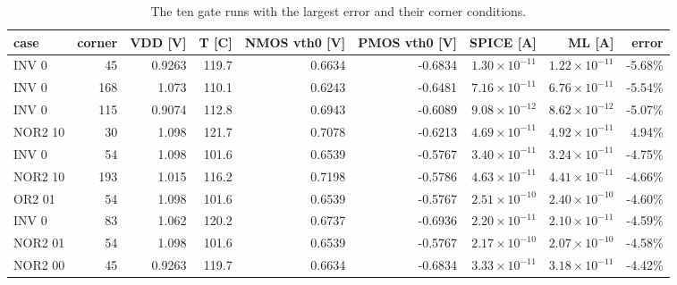 \begin{table}[H]
\centering
{\small
\begin{adjustbox}{max width=\linewidth}
\begin{tabular}{lrrrrrrrr}
\toprule
case & corner & VDD [V] & T [C] & NMOS vth0 [V] & PMOS vth0 [V] & SPICE [A] & ML [A] & error \\
\midrule
INV 0 & 45 & 0.9263 & 119.7 & 0.6634 & -0.6834 & $1.30\times10^{-11}$ & $1.22\times10^{-11}$ & -5.68\% \\
INV 0 & 168 & 1.073 & 110.1 & 0.6243 & -0.6481 & $7.16\times10^{-11}$ & $6.76\times10^{-11}$ & -5.54\% \\
INV 0 & 115 & 0.9074 & 112.8 & 0.6943 & -0.6089 & $9.08\times10^{-12}$ & $8.62\times10^{-12}$ & -5.07\% \\
NOR2 10 & 30 & 1.098 & 121.7 & 0.7078 & -0.6213 & $4.69\times10^{-11}$ & $4.92\times10^{-11}$ & 4.94\% \\
INV 0 & 54 & 1.098 & 101.6 & 0.6539 & -0.5767 & $3.40\times10^{-11}$ & $3.24\times10^{-11}$ & -4.75\% \\
NOR2 10 & 193 & 1.015 & 116.2 & 0.7198 & -0.5786 & $4.63\times10^{-11}$ & $4.41\times10^{-11}$ & -4.66\% \\
OR2 01 & 54 & 1.098 & 101.6 & 0.6539 & -0.5767 & $2.51\times10^{-10}$ & $2.40\times10^{-10}$ & -4.60\% \\
INV 0 & 83 & 1.062 & 120.2 & 0.6737 & -0.6936 & $2.20\times10^{-11}$ & $2.10\times10^{-11}$ & -4.59\% \\
NOR2 01 & 54 & 1.098 & 101.6 & 0.6539 & -0.5767 & $2.17\times10^{-10}$ & $2.07\times10^{-10}$ & -4.58\% \\
NOR2 00 & 45 & 0.9263 & 119.7 & 0.6634 & -0.6834 & $3.33\times10^{-11}$ & $3.18\times10^{-11}$ & -4.42\% \\
\bottomrule
\end{tabular}
\end{adjustbox}
}
\caption{The ten gate runs with the largest error and their corner conditions.}
\label{tab:worst}
\end{table}

